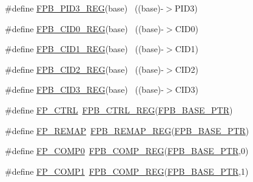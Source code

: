\begin{DoxyCompactItemize}
\#define \hyperlink{group___f_p_b___register___accessor___macros_gabc08353b16dcd1523e16e6cb4f2f6d55}{F\+P\+B\+\_\+\+P\+I\+D3\+\_\+\+R\+EG}(base)                                          ~((base)-\/$>$P\+I\+D3)
\item 
\#define \hyperlink{group___f_p_b___register___accessor___macros_ga0489173b7028d084cc37f751c01c3a45}{F\+P\+B\+\_\+\+C\+I\+D0\+\_\+\+R\+EG}(base)                                          ~((base)-\/$>$C\+I\+D0)
\item 
\#define \hyperlink{group___f_p_b___register___accessor___macros_ga6fb403a75294c6d76d2bdf8156620f33}{F\+P\+B\+\_\+\+C\+I\+D1\+\_\+\+R\+EG}(base)                                          ~((base)-\/$>$C\+I\+D1)
\item 
\#define \hyperlink{group___f_p_b___register___accessor___macros_ga36d0d49963902114ed3fcf12f2a4226a}{F\+P\+B\+\_\+\+C\+I\+D2\+\_\+\+R\+EG}(base)                                          ~((base)-\/$>$C\+I\+D2)
\item 
\#define \hyperlink{group___f_p_b___register___accessor___macros_ga69bcecf152c05571bbcdb2160cacbd45}{F\+P\+B\+\_\+\+C\+I\+D3\+\_\+\+R\+EG}(base)                                          ~((base)-\/$>$C\+I\+D3)
\item 
\#define \hyperlink{group___f_p_b___register___accessor___macros_ga23de55de0fdb50910ba8ab05e187e568}{F\+P\+\_\+\+C\+T\+RL}~\hyperlink{group___f_p_b___register___accessor___macros_ga51c51db7f0fa370f16b973df21399a88}{F\+P\+B\+\_\+\+C\+T\+R\+L\+\_\+\+R\+EG}(\hyperlink{group___f_p_b___peripheral_ga95d994c97f967ce02339465def6bac95}{F\+P\+B\+\_\+\+B\+A\+S\+E\+\_\+\+P\+TR})
\item 
\#define \hyperlink{group___f_p_b___register___accessor___macros_ga359b40159d279babcfaf6832695ba88b}{F\+P\+\_\+\+R\+E\+M\+AP}~\hyperlink{group___f_p_b___register___accessor___macros_gaa4d1a55b94416f3ef869793d4d461e5c}{F\+P\+B\+\_\+\+R\+E\+M\+A\+P\+\_\+\+R\+EG}(\hyperlink{group___f_p_b___peripheral_ga95d994c97f967ce02339465def6bac95}{F\+P\+B\+\_\+\+B\+A\+S\+E\+\_\+\+P\+TR})
\item 
\#define \hyperlink{group___f_p_b___register___accessor___macros_gad8c0ae3c9feb5260f6386178437e6836}{F\+P\+\_\+\+C\+O\+M\+P0}~\hyperlink{group___f_p_b___register___accessor___macros_ga52fd8faa26cc52d39d15e4897e218bcb}{F\+P\+B\+\_\+\+C\+O\+M\+P\+\_\+\+R\+EG}(\hyperlink{group___f_p_b___peripheral_ga95d994c97f967ce02339465def6bac95}{F\+P\+B\+\_\+\+B\+A\+S\+E\+\_\+\+P\+TR},0)
\item 
\#define \hyperlink{group___f_p_b___register___accessor___macros_ga8011b96c64bef3753cb67a4fab3db44a}{F\+P\+\_\+\+C\+O\+M\+P1}~\hyperlink{group___f_p_b___register___accessor___macros_ga52fd8faa26cc52d39d15e4897e218bcb}{F\+P\+B\+\_\+\+C\+O\+M\+P\+\_\+\+R\+EG}(\hyperlink{group___f_p_b___peripheral_ga95d994c97f967ce02339465def6bac95}{F\+P\+B\+\_\+\+B\+A\+S\+E\+\_\+\+P\+TR},1)

\end{DoxyCompactItemize}
